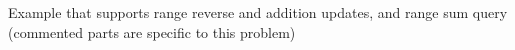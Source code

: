 Example that supports range reverse and addition updates, and range sum query
(commented parts are specific to this  problem)
